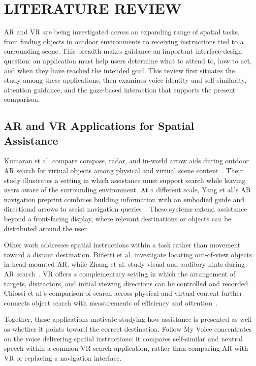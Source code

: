 \chapter{LITERATURE REVIEW}
\label{ch:literature}
AR and VR are being investigated across an expanding range of spatial tasks, from finding objects in outdoor environments to receiving instructions tied to a surrounding scene. This breadth makes guidance an important interface-design question: an application must help users determine what to attend to, how to act, and when they have reached the intended goal. This review first situates the study among these applications, then examines voice identity and self-similarity, attention guidance, and the gaze-based interaction that supports the present comparison.

\section{AR and VR Applications for Spatial Assistance}
Kumaran et al. compare compass, radar, and in-world arrow aids during outdoor AR search for virtual objects among physical and virtual scene content~\cite{kumaran2023navigation}. Their study illustrates a setting in which assistance must support search while leaving users aware of the surrounding environment. At a different scale, Yang et al.'s AR navigation preprint combines building information with an embodied guide and directional arrows to assist navigation queries~\cite{yang2025embodiednavigation}. These systems extend assistance beyond a front-facing display, where relevant destinations or objects can be distributed around the user.

Other work addresses spatial instructions within a task rather than movement toward a distant destination. Binetti et al. investigate locating out-of-view objects in head-mounted AR, while Zhang et al. study visual and auditory hints during AR search~\cite{binetti2021outofview,zhang2023seehear}. VR offers a complementary setting in which the arrangement of targets, distractors, and initial viewing directions can be controlled and recorded. Chiossi et al.'s comparison of search across physical and virtual content further connects object search with measurements of efficiency and attention~\cite{chiossi2024searching}.

Together, these applications motivate studying how assistance is presented as well as whether it points toward the correct destination. Follow My Voice concentrates on the voice delivering spatial instructions: it compares self-similar and neutral speech within a common VR search application, rather than comparing AR with VR or replacing a navigation interface.

